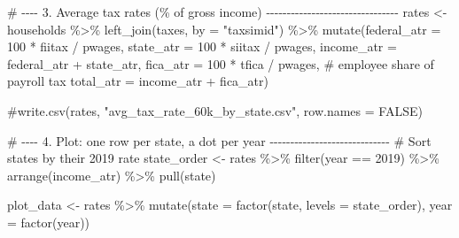 \documentclass[
  letterpaper,
  DIV=11,
  numbers=noendperiod]{scrartcl}
\newenvironment{Shaded}{\begin{snugshade}}{\end{snugshade}}
\newcommand{\AttributeTok}[1]{\textcolor[rgb]{0.40,0.45,0.13}{#1}}
\newcommand{\CommentTok}[1]{\textcolor[rgb]{0.37,0.37,0.37}{#1}}
\newcommand{\DecValTok}[1]{\textcolor[rgb]{0.68,0.00,0.00}{#1}}
\newcommand{\FunctionTok}[1]{\textcolor[rgb]{0.28,0.35,0.67}{#1}}
\newcommand{\NormalTok}[1]{\textcolor[rgb]{0.00,0.23,0.31}{#1}}
\newcommand{\OtherTok}[1]{\textcolor[rgb]{0.00,0.23,0.31}{#1}}
\newcommand{\SpecialCharTok}[1]{\textcolor[rgb]{0.37,0.37,0.37}{#1}}
\newcommand{\StringTok}[1]{\textcolor[rgb]{0.13,0.47,0.30}{#1}}
\begin{document}
\begin{Shaded}
\begin{Highlighting}[]
\CommentTok{\# {-}{-}{-}{-} 3. Average tax rates (\% of gross income) {-}{-}{-}{-}{-}{-}{-}{-}{-}{-}{-}{-}{-}{-}{-}{-}{-}{-}{-}{-}{-}{-}{-}{-}{-}{-}{-}{-}{-}{-}{-}{-}}
\NormalTok{rates }\OtherTok{\textless{}{-}}\NormalTok{ households }\SpecialCharTok{\%\textgreater{}\%}
  \FunctionTok{left\_join}\NormalTok{(taxes, }\AttributeTok{by =} \StringTok{"taxsimid"}\NormalTok{) }\SpecialCharTok{\%\textgreater{}\%}
  \FunctionTok{mutate}\NormalTok{(}\AttributeTok{federal\_atr =} \DecValTok{100} \SpecialCharTok{*}\NormalTok{ fiitax }\SpecialCharTok{/}\NormalTok{ pwages,}
         \AttributeTok{state\_atr   =} \DecValTok{100} \SpecialCharTok{*}\NormalTok{ siitax }\SpecialCharTok{/}\NormalTok{ pwages,}
         \AttributeTok{income\_atr  =}\NormalTok{ federal\_atr }\SpecialCharTok{+}\NormalTok{ state\_atr,}
         \AttributeTok{fica\_atr    =} \DecValTok{100} \SpecialCharTok{*}\NormalTok{ tfica }\SpecialCharTok{/}\NormalTok{ pwages,   }\CommentTok{\# employee share of payroll tax}
         \AttributeTok{total\_atr   =}\NormalTok{ income\_atr }\SpecialCharTok{+}\NormalTok{ fica\_atr)}

\CommentTok{\#write.csv(rates, "avg\_tax\_rate\_60k\_by\_state.csv", row.names = FALSE)}

\CommentTok{\# {-}{-}{-}{-} 4. Plot: one row per state, a dot per year {-}{-}{-}{-}{-}{-}{-}{-}{-}{-}{-}{-}{-}{-}{-}{-}{-}{-}{-}{-}{-}{-}{-}{-}{-}{-}{-}{-}{-}}
\CommentTok{\# Sort states by their 2019 rate}
\NormalTok{state\_order }\OtherTok{\textless{}{-}}\NormalTok{ rates }\SpecialCharTok{\%\textgreater{}\%}
  \FunctionTok{filter}\NormalTok{(year }\SpecialCharTok{==} \DecValTok{2019}\NormalTok{) }\SpecialCharTok{\%\textgreater{}\%}
  \FunctionTok{arrange}\NormalTok{(income\_atr) }\SpecialCharTok{\%\textgreater{}\%}
  \FunctionTok{pull}\NormalTok{(state)}

\NormalTok{plot\_data }\OtherTok{\textless{}{-}}\NormalTok{ rates }\SpecialCharTok{\%\textgreater{}\%}
  \FunctionTok{mutate}\NormalTok{(}\AttributeTok{state =} \FunctionTok{factor}\NormalTok{(state, }\AttributeTok{levels =}\NormalTok{ state\_order),}
         \AttributeTok{year  =} \FunctionTok{factor}\NormalTok{(year))}


\end{Highlighting}
\end{Shaded}
\end{document}
